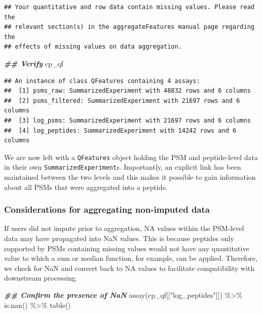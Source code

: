 \documentclass[9pt,a4paper,]{extarticle}
\newenvironment{Shaded}{\begin{snugshade}}{\end{snugshade}}
\newcommand{\DocumentationTok}[1]{\textcolor[rgb]{0.56,0.35,0.01}{\textbf{\textit{#1}}}}
\newcommand{\FunctionTok}[1]{\textcolor[rgb]{0.00,0.00,0.00}{#1}}
\newcommand{\NormalTok}[1]{#1}
\newcommand{\SpecialCharTok}[1]{\textcolor[rgb]{0.00,0.00,0.00}{#1}}
\newcommand{\StringTok}[1]{\textcolor[rgb]{0.31,0.60,0.02}{#1}}
\begin{document}
\begin{verbatim}
## Your quantitative and row data contain missing values. Please read the
## relevant section(s) in the aggregateFeatures manual page regarding the
## effects of missing values on data aggregation.
\end{verbatim}

\begin{Shaded}
\begin{Highlighting}[]
\DocumentationTok{\#\# Verify}
\NormalTok{cp\_qf}
\end{Highlighting}
\end{Shaded}

\begin{verbatim}
## An instance of class QFeatures containing 4 assays:
##  [1] psms_raw: SummarizedExperiment with 48832 rows and 6 columns 
##  [2] psms_filtered: SummarizedExperiment with 21697 rows and 6 columns 
##  [3] log_psms: SummarizedExperiment with 21697 rows and 6 columns 
##  [4] log_peptides: SummarizedExperiment with 14242 rows and 6 columns
\end{verbatim}

We are now left with a \texttt{QFeatures} object holding the PSM and peptide-level data
in their own \texttt{SummarizedExperiment}s. Importantly, an explicit link has been
maintained between the two levels and this makes it possible to gain information
about all PSMs that were aggregated into a peptide.

\hypertarget{considerations-for-aggregating-non-imputed-data}{%
\subsubsection{Considerations for aggregating non-imputed data}\label{considerations-for-aggregating-non-imputed-data}}

If users did not impute prior to aggregation, NA values within the PSM-level
data may have propagated into NaN values. This is because peptides only
supported by PSMs containing missing values would not have any quantitative
value to which a sum or median function, for example, can be applied. Therefore,
we check for NaN and convert back to NA values to facilitate compatibility with
downstream processing.

\begin{Shaded}
\begin{Highlighting}[]
\DocumentationTok{\#\# Confirm the presence of NaN}
\FunctionTok{assay}\NormalTok{(cp\_qf[[}\StringTok{"log\_peptides"}\NormalTok{]]) }\SpecialCharTok{\%\textgreater{}\%}
  \FunctionTok{is.nan}\NormalTok{() }\SpecialCharTok{\%\textgreater{}\%}
  \FunctionTok{table}\NormalTok{()}
\end{Highlighting}
\end{Shaded}
\end{document}
